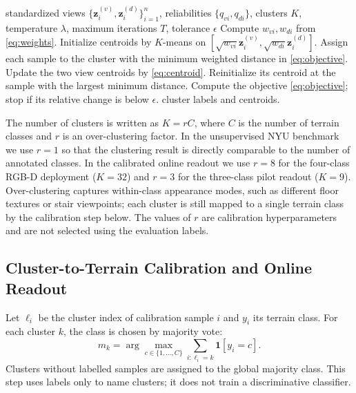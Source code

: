 \documentclass[final,3p,times]{elsarticle}
\begin{document}
\begin{algorithm}[t]
\caption{Per-sample reliability-weighted multi-view $K$-means}
\label{alg:rwkmeans}
\begin{algorithmic}[1]
\Require standardized views $\{\mathbf{z}_i^{(v)},\mathbf{z}_i^{(d)}\}_{i=1}^{n}$, reliabilities $\{q_{vi},q_{di}\}$, clusters $K$, temperature $\lambda$, maximum iterations $T$, tolerance $\epsilon$
\State Compute $w_{vi},w_{di}$ from \eqref{eq:weights}.
\State Initialize centroids by $K$-means on $[\sqrt{w_{vi}}\mathbf{z}_i^{(v)},\sqrt{w_{di}}\mathbf{z}_i^{(d)}]$.
    \State Assign each sample to the cluster with the minimum weighted distance in \eqref{eq:objective}.
    \State Update the two view centroids by \eqref{eq:centroid}.
        \State Reinitialize its centroid at the sample with the largest minimum distance.
    \EndIf
    \State Compute the objective \eqref{eq:objective}; stop if its relative change is below $\epsilon$.
\EndFor
\State \Return cluster labels and centroids.
\end{algorithmic}
\end{algorithm}

The number of clusters is written as $K=rC$, where $C$ is the number of terrain classes and $r$ is an over-clustering factor. In the unsupervised NYU benchmark we use $r=1$ so that the clustering result is directly comparable to the number of annotated classes. In the calibrated online readout we use $r=8$ for the four-class RGB-D deployment ($K=32$) and $r=3$ for the three-class pilot readout ($K=9$). Over-clustering captures within-class appearance modes, such as different floor textures or stair viewpoints; each cluster is still mapped to a single terrain class by the calibration step below. The values of $r$ are calibration hyperparameters and are not selected using the evaluation labels.

\subsection{Cluster-to-Terrain Calibration and Online Readout}
\label{subsec:readout}
Let $\ell_i$ be the cluster index of calibration sample $i$ and $y_i$ its terrain class. For each cluster $k$, the class is chosen by majority vote:
\begin{equation}
m_k = \arg\max_{c\in\{1,\dots,C\}}
\sum_{i:\ell_i=k}\mathbf{1}[y_i=c].
\label{eq:mapping}
\end{equation}
Clusters without labelled samples are assigned to the global majority class. This step uses labels only to name clusters; it does not train a discriminative classifier.
\end{document}
